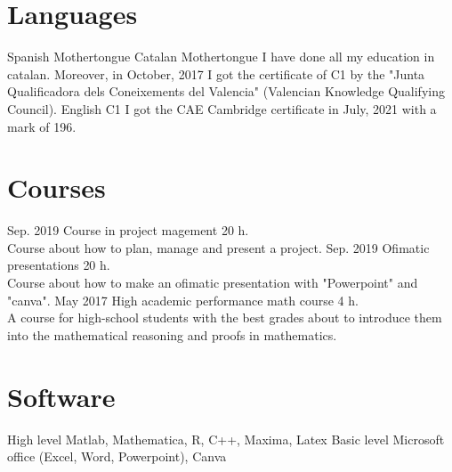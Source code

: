 \documentclass[]{cv-style}          %
\begin{document}
\newpage
\section{Languages}

\begin{entrylist}
\entry
    {Spanish}
    {Mothertongue}
    {}
    {}
\entry
    {Catalan}
    {Mothertongue}
    {}
    {I have done all my education in catalan. Moreover, in October, 2017 I got the certificate of C1 by the "Junta Qualificadora dels Coneixements del Valencia" (Valencian Knowledge Qualifying Council).}
\entry
    {English}
    {C1}
    {}
    {I got the CAE Cambridge certificate in July, 2021 with a mark of 196.}
\end{entrylist}

\section{Courses}

\begin{entrylist}
\entry
    {Sep. 2019}
    {Course in project magement}
    {20 h.}
    {\\
    Course about how to plan, manage and present a project.}
\entry
    {Sep. 2019}
    {Ofimatic presentations}
    {20 h.}
    {\\
    Course about how to make an ofimatic presentation with "Powerpoint" and "canva".}
\entry
    {May 2017}
    {High academic performance math course}
    {4 h.}
    {\\
    A course for high-school students with the best grades about to introduce them into the mathematical reasoning and proofs in mathematics.}
\end{entrylist}

\section{Software}

\begin{entrylist}
\entry
    {High level}
    {Matlab, Mathematica, R, C++, Maxima, Latex}
    {}
    {}
\entry
    {Basic level}
    {Microsoft office (Excel, Word, Powerpoint), Canva}
    {}
    {}
\end{entrylist}
\end{document}

